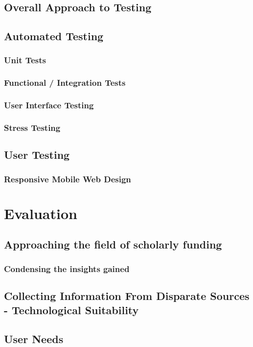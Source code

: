 \section{Overall Approach to Testing}
\section{Automated Testing}
\subsection{Unit Tests}
\subsection{Functional / Integration Tests}
\subsection{User Interface Testing}
\subsection{Stress Testing}
\section{User Testing}
\subsection{Responsive Mobile Web Design}
\chapter{Evaluation}
\section{Approaching the field of scholarly funding}
\subsection{Condensing the insights gained}
\section{Collecting Information From Disparate Sources - Technological Suitability}
\section{User Needs}
